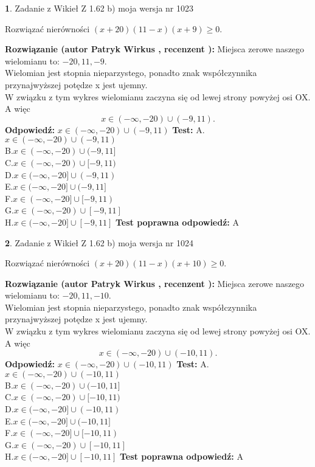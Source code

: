 \documentclass[12pt, a4paper]{article}
\theoremstyle{definition} %
\newtheorem{zad}{}
\newcommand{\zadStart}[1]{\begin{zad}#1\newline}
\newcommand{\zadStop}{\end{zad}}
\newcommand{\rozwStart}[2]{\noindent \textbf{Rozwiązanie (autor #1 , recenzent #2): }\newline}
\newcommand{\rozwStop}{\newline}
\newcommand{\odpStart}{\noindent \textbf{Odpowiedź:}\newline}
\newcommand{\odpStop}{\newline}
\newcommand{\testStart}{\noindent \textbf{Test:}\newline}
\newcommand{\testStop}{\newline}
\newcommand{\kluczStart}{\noindent \textbf{Test poprawna odpowiedź:}\newline}
\newcommand{\kluczStop}{\newline}
\begin{document}
\zadStart{Zadanie z Wikieł Z 1.62 b) moja wersja nr 1023}

Rozwiązać nierówności $(x+20)(11-x)(x+9)\ge0$.
\zadStop
\rozwStart{Patryk Wirkus}{}
Miejsca zerowe naszego wielomianu to: $-20, 11, -9$.\\
Wielomian jest stopnia nieparzystego, ponadto znak współczynnika przy\linebreak najwyższej potędze x jest ujemny.\\ W związku z tym wykres wielomianu zaczyna się od lewej strony powyżej osi OX. A więc $$x \in (-\infty,-20) \cup (-9,11).$$
\rozwStop
\odpStart
$x \in (-\infty,-20) \cup (-9,11)$
\odpStop
\testStart
A.$x \in (-\infty,-20) \cup (-9,11)$\\
B.$x \in (-\infty,-20) \cup (-9,11]$\\
C.$x \in (-\infty,-20) \cup [-9,11)$\\
D.$x \in (-\infty,-20] \cup (-9,11)$\\
E.$x \in (-\infty,-20] \cup (-9,11]$\\
F.$x \in (-\infty,-20] \cup [-9,11)$\\
G.$x \in (-\infty,-20) \cup [-9,11]$\\
H.$x \in (-\infty,-20] \cup [-9,11]$
\testStop
\kluczStart
A
\kluczStop



\zadStart{Zadanie z Wikieł Z 1.62 b) moja wersja nr 1024}

Rozwiązać nierówności $(x+20)(11-x)(x+10)\ge0$.
\zadStop
\rozwStart{Patryk Wirkus}{}
Miejsca zerowe naszego wielomianu to: $-20, 11, -10$.\\
Wielomian jest stopnia nieparzystego, ponadto znak współczynnika przy\linebreak najwyższej potędze x jest ujemny.\\ W związku z tym wykres wielomianu zaczyna się od lewej strony powyżej osi OX. A więc $$x \in (-\infty,-20) \cup (-10,11).$$
\rozwStop
\odpStart
$x \in (-\infty,-20) \cup (-10,11)$
\odpStop
\testStart
A.$x \in (-\infty,-20) \cup (-10,11)$\\
B.$x \in (-\infty,-20) \cup (-10,11]$\\
C.$x \in (-\infty,-20) \cup [-10,11)$\\
D.$x \in (-\infty,-20] \cup (-10,11)$\\
E.$x \in (-\infty,-20] \cup (-10,11]$\\
F.$x \in (-\infty,-20] \cup [-10,11)$\\
G.$x \in (-\infty,-20) \cup [-10,11]$\\
H.$x \in (-\infty,-20] \cup [-10,11]$
\testStop
\kluczStart
A
\kluczStop
\end{document}
